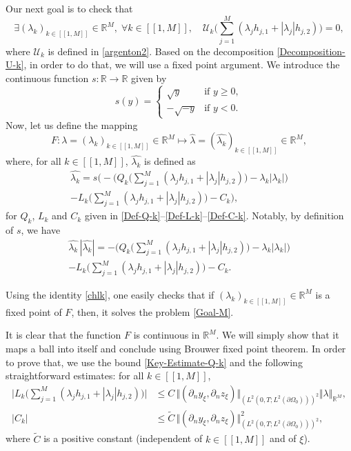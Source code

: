 \documentclass[11pt]{article}
\numberwithin{equation}{section}
\newcommand{\llbracket}{[\![}
\newcommand{\rrbracket}{]\!]}
\newcommand\R{{\mathbb R}}
\newcommand{\norm}[1]{\Vert#1\Vert}
\theoremstyle{definition}
\begin{document}
Our next goal is to check that
\begin{equation}
\label{Goal-M}
\exists (\lambda_{k})_{k \in \llbracket 1,M \rrbracket } \in \R^{M}
,\;\forall k \in \llbracket 1,M \rrbracket,
\quad
\mathcal{U}_k\biggl(
\sum_{j= 1}^M (\lambda_{j} h_{j,1} + |\lambda_{j}| h_{j,2})
\biggr)
= 0,
\end{equation}
where $\mathcal{U}_k$ is defined in \eqref{argenton2}. Based on the decomposition \eqref{Decomposition-U-k}, in order to do that, we will use a fixed point argument. We introduce the continuous function $s:\mathbb R\to \mathbb R$ given by\vspace*{-3pt}
\[
s(y)=\begin{cases}
\sqrt{y}&\text{if }y\geqslant 0,\\
-\sqrt{-y}&\text{if } y<0.
\end{cases}
\]
Now, let us define the mapping
\[
F : \lambda = (\lambda_{k})_{k \in \llbracket 1,M \rrbracket } \in \R^{M} \longmapsto \widehat \lambda = (\widehat{\lambda_{k}})_{k \in \llbracket 1,M \rrbracket } \in \R^{M},
\]
where, for all $k \in \llbracket 1,M \rrbracket $, $\widehat{\lambda_k}$ is defined as
\begin{multline*}
\widehat{\lambda_k}= s \biggl(- \biggl(Q_k\biggl(\sum_{j= 1}^M (\lambda_{j} h_{j,1} + |\lambda_{j}| h_{j,2})\biggr)- \lambda_k |\lambda_k| \biggr)\\[-10pt]
- L_k \biggl(\sum_{j= 1}^M (\lambda_{j} h_{j,1} + |\lambda_{j}| h_{j,2})\biggr)- C_k\biggr),
\end{multline*}
for $Q_k$, $L_k$ and $C_k$ given in \eqref{Def-Q-k}--\eqref{Def-L-k}--\eqref{Def-C-k}. Notably, by definition of $s$, we have
\begin{multline}\label{chlk}
\widehat{\lambda_k}\, |\widehat{\lambda_k}| = - \biggl(Q_k\biggl(\sum_{j= 1}^M (\lambda_{j} h_{j,1} + |\lambda_{j}| h_{j,2})\biggl)- \lambda_k |\lambda_k| \biggr)\\[-5pt]
- L_k \biggl(\sum_{j= 1}^M (\lambda_{j} h_{j,1} + |\lambda_{j}| h_{j,2})\biggr)- C_k.
\end{multline}

Using the identity \eqref{chlk}, one easily checks that if $(\lambda_{k})_{k \in \llbracket 1,M \rrbracket } \in \R^{M} $ is a fixed point of $F$, then, it solves the problem \eqref{Goal-M}.

It is clear that the function $F$ is continuous in $\R^M$. We will simply show that it maps a ball into itself and conclude using Brouwer fixed point theorem. In order to prove that, we use the bound \eqref{Key-Estimate-Q-k} and the following straightforward estimates: for all $k \in \llbracket 1,M \rrbracket $,
\begin{align*}
\biggl| L_k\biggl(
\sum_{j= 1}^M (\lambda_{j} h_{j,1} + |\lambda_{j}| h_{j,2})
\biggr)
\biggr|
&\leq C\, \norm{(\partial_n y_\xi, \partial_n z_\xi)}_{(L^2(0,T; L^2(\partial \Omega_0)))^2} \norm{\lambda}_{\R^M},
\\
| C_k | &\leq \tilde{C}\,\norm{(\partial_n y_\xi, \partial_n z_\xi)}_{(L^2(0,T; L^2(\partial \Omega_0)))^2}^2,
\end{align*}
where {$\tilde{C}$} is a positive constant (independent of $k \in \llbracket 1,M \rrbracket $ and of $\xi$).
\end{document}
